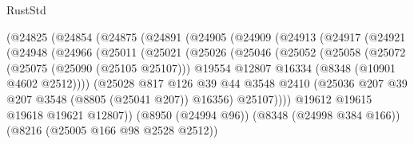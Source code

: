\begin{lexlean}{RustStd}
\begin{coremodule}
                      (@24825
                        (@24854
                          (@24875
                            (@24891
                              (@24905
                                (@24909
                                  (@24913
                                    (@24917
                                      (@24921
                                        (@24948
                                          (@24966
                                            (@25011
                                              (@25021
                                                (@25026
                                                  (@25046
                                                    (@25052
                                                      (@25058
                                                        (@25072
                                                          (@25075 (@25090 (@25105 @25107)))
                                                          @19554
                                                          @12807
                                                          @16334
                                                          (@8348 (@10901 @4602 @2512))))
                                                      (@25028
                                                        @817
                                                        @126
                                                        @39
                                                        @44
                                                        @3548
                                                        @2410
                                                        (@25036
                                                          @207
                                                          @39
                                                          @207
                                                          @3548
                                                          (@8805 (@25041 @207))
                                                          @16356)
                                                        @25107))))
                                                @19612
                                                @19615
                                                @19618
                                                @19621
                                                @12807))
                                            (@8950 (@24994 @96))
                                            (@8348 (@24998 @384 @166))
                                            (@8216 (@25005 @166 @98 @2528 @2512))

\end{coremodule}
\end{lexlean}
